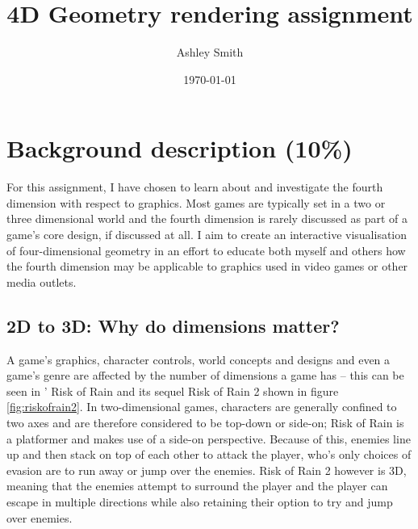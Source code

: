 \documentclass[11pt, a4paper]{article}
\begin{document}
\title{\titlefont 4D Geometry rendering assignment}
\author{Ashley Smith}
\date{\today}
\maketitle
\thispagestyle{empty}


\cleardoublepage
\setcounter{page}{1}
\tableofcontents

\cleardoublepage
{}
\setcounter{page}{1}

\section{Background description (10\%)}

For this assignment, I have chosen to learn about and investigate the fourth dimension with respect to graphics. Most games are typically set in a two or three dimensional world and the fourth dimension is rarely discussed as part of a game's core design, if discussed at all. I aim to create an interactive visualisation of four-dimensional geometry in an effort to educate both myself and others how the fourth dimension may be applicable to graphics used in video games or other media outlets.

\subsection{2D to 3D: Why do dimensions matter?}

A game's graphics, character controls, world concepts and designs and even a game's genre are affected by the number of dimensions a game has -- this can be seen in \citeauthor*{riskofrain}' Risk of Rain \parencite*{riskofrain} and its sequel Risk of Rain 2 \parencite{riskofrain2} shown in figure \ref{fig:riskofrain2}. In two-dimensional games, characters are generally confined to two axes and are therefore considered to be top-down or side-on; Risk of Rain is a platformer and makes use of a side-on perspective. Because of this, enemies line up and then stack on top of each other to attack the player, who's only choices of evasion are to run away or jump over the enemies. Risk of Rain 2 however is 3D, meaning that the enemies attempt to surround the player and the player can escape in multiple directions while also retaining their option to try and jump over enemies.
\end{document}
